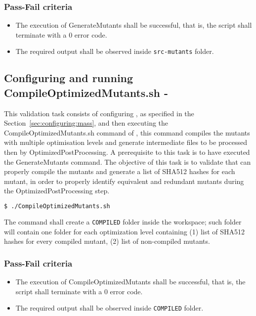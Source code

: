 \subsubsection{Pass-Fail criteria}

\begin{itemize}
  \item The execution of GenerateMutants shall be successful, that is, the script shall terminate with a 0 error code.
  \item The required output shall be observed inside \texttt{src-mutants} folder.
\end{itemize}

\subsection{Configuring \MASS and running CompileOptimizedMutants.sh - \MASS}

This validation task consists of configuring \MASS, as specified in the Section~\ref{sec:configuring:mass}, and then executing the CompileOptimizedMutants.sh command of \MASS, this command compiles the mutants with multiple optimisation levels and generate intermediate files to be processed then by OptimizedPostProcessing. A prerequisite to this task is to have executed the GenerateMutants command.
The objective of this task is to validate that \MASS can properly compile the mutants and generate a list of SHA512 hashes for each mutant, in order to properly identify equivalent and redundant mutants during the OptimizedPostProcessing step.

\begin{lstlisting}[language=bash]
  $ ./CompileOptimizedMutants.sh
\end{lstlisting}

The command shall create a \texttt{COMPILED} folder inside the \MASS workspace; such folder will contain one folder for each optimization level containing (1) list of SHA512 hashes for every compiled mutant, (2) list of non-compiled mutants.

\subsubsection{Pass-Fail criteria}

\begin{itemize}
  \item The execution of CompileOptimizedMutants shall be successful, that is, the script shall terminate with a 0 error code.
  \item The required output shall be observed inside \texttt{COMPILED} folder.
\end{itemize}

